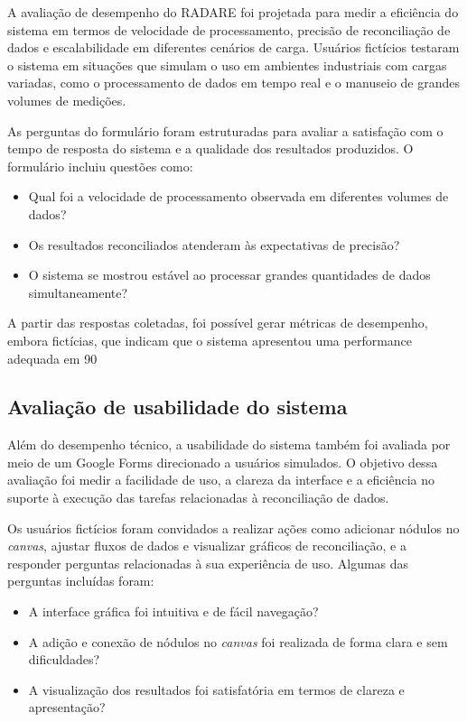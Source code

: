 A avaliação de desempenho do RADARE foi projetada para medir a eficiência do sistema em termos de velocidade de processamento, precisão de reconciliação de dados e escalabilidade em diferentes cenários de carga. Usuários fictícios testaram o sistema em situações que simulam o uso em ambientes industriais com cargas variadas, como o processamento de dados em tempo real e o manuseio de grandes volumes de medições.

As perguntas do formulário foram estruturadas para avaliar a satisfação com o tempo de resposta do sistema e a qualidade dos resultados produzidos. O formulário incluiu questões como:

\begin{itemize}
    \item Qual foi a velocidade de processamento observada em diferentes volumes de dados?
    \item Os resultados reconciliados atenderam às expectativas de precisão?
    \item O sistema se mostrou estável ao processar grandes quantidades de dados simultaneamente?
\end{itemize}

A partir das respostas coletadas, foi possível gerar métricas de desempenho, embora fictícias, que indicam que o sistema apresentou uma performance adequada em 90%

\subsection{Avaliação de usabilidade do sistema}

Além do desempenho técnico, a usabilidade do sistema também foi avaliada por meio de um Google Forms direcionado a usuários simulados. O objetivo dessa avaliação foi medir a facilidade de uso, a clareza da interface e a eficiência no suporte à execução das tarefas relacionadas à reconciliação de dados.

Os usuários fictícios foram convidados a realizar ações como adicionar nódulos no \textit{canvas}, ajustar fluxos de dados e visualizar gráficos de reconciliação, e a responder perguntas relacionadas à sua experiência de uso. Algumas das perguntas incluídas foram:

\begin{itemize}
    \item A interface gráfica foi intuitiva e de fácil navegação?
    \item A adição e conexão de nódulos no \textit{canvas} foi realizada de forma clara e sem dificuldades?
    \item A visualização dos resultados foi satisfatória em termos de clareza e apresentação?
\end{itemize}

